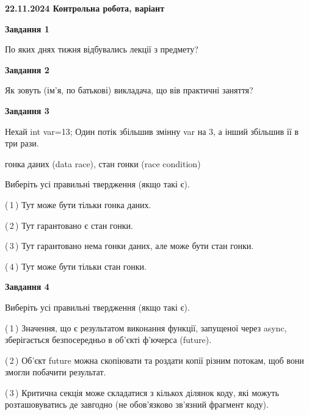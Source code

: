 \documentclass[12pt, ukrainian]{article}
\begin{document}
\begin {large}

\textbf{22.11.2024 Контрольна робота, варіант  }\par


{

\begin{center}
\textbf{Завдання 1}
\end{center}

По яких днях тижня відбувались лекції з предмету?


\begin{center}
\textbf{Завдання 2}
\end{center}

Як зовуть (ім'я, по батькові) викладача, що вів практичні заняття?


\begin{center}
\textbf{Завдання 3}
\end{center}

Нехай int var=13; Один потік збільшив змінну var на 3, а інший збільшив її в три рази.

гонка даних (data race), стан гонки (race condition)

Виберіть усі правильні твердження (якщо такі є).\par
\vspace{2mm}
(\,1\,) Тут може бути тільки гонка даних.%

(\,2\,) Тут гарантовано є стан гонки.%

(\,3\,) Тут гарантовано нема гонки даних, але може бути стан гонки.%

(\,4\,) Тут може бути тільки стан гонки.%


\begin{center}
\textbf{Завдання 4}
\end{center}

Виберіть усі правильні твердження (якщо такі є).\par
\vspace{2mm}

(\,1\,) Значення, що є результатом виконання функції, запущеної через async, зберігається безпосередньо в об’єкті ф’ючерса (future).%

(\,2\,) Об’єкт future можна скопіювати та роздати копії різним потокам, щоб вони змогли побачити результат.%

(\,3\,) Критична секція може складатися з кількох ділянок коду, які можуть розташовуватись де завгодно (не обов’язково зв’язний фрагмент коду).%

}
\end{large}
\end{document}
